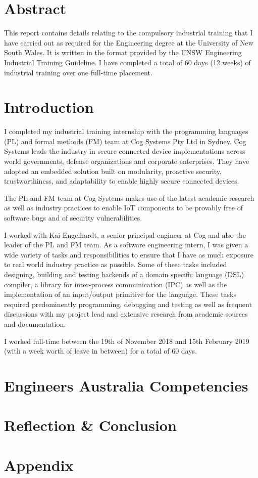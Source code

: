 \documentclass{report}
\begin{document}
\tableofcontents

\chapter*{Abstract}
This report contains details relating to the compulsory industrial training 
that I have carried out as required for the Engineering degree at the University of New South Wales.
It is written in the format provided by the UNSW Engineering Industrial Training Guideline.
I have completed a total of 60 days (12 weeks) of industrial training over one full-time placement.

\chapter{Introduction}
I completed my industrial training internship with the programming languages (PL) and formal methods (FM) team at Cog Systems Pty Ltd in Sydney. 
Cog Systems leads the industry in secure connected device implementations across world governments, defense organizations and corporate enterprises.
They have adopted an embedded solution built on modularity, proactive security, trustworthiness, and adaptability to enable highly secure connected devices.

The PL and FM team at Cog Systems makes use of the latest academic research as well as industry practices to enable IoT components to be provably free of software bugs and of security vulnerabilities.

I worked with Kai Engelhardt, a senior principal engineer at Cog and also the leader of the PL and FM team. 
As a software engineering intern, I was given a wide variety of tasks and responsibilities to ensure that I have as much exposure to real world industry practice as possible.
Some of these tasks included designing, building and testing backends of a domain specific language (DSL) compiler, a library for inter-process communication (IPC) 
as well as the implementation of an input/output primitive for the language.
These tasks required predominently programming, debugging and testing as well as frequent discussions with my project lead and extensive research from academic sources and documentation.

I worked full-time between the 19th of November 2018 and 15th February 2019 (with a week worth of leave in between) for a total of 60 days.

\chapter{Engineers Australia Competencies}

\chapter{Reflection \& Conclusion}

\chapter{Appendix}
\end{document}
